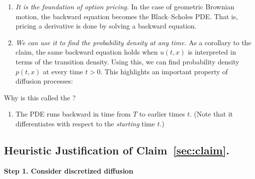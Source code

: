 \documentclass{article} %
\begin{document}
\begin{enumerate}
	\item \textit{It is the foundation of option pricing.} In the case of geometric Brownian motion, the backward equation becomes the Black–Scholes PDE.  That is, pricing a derivative is done by solving a backward equation.	
\item \textit{We can use it to find the probability density at any time.}  As a corollary to the claim, the same backward equation holds when $u(t,x)$ is interpreted in terms of the transition density.  Using this, we can find probability density $p(t,x)$ at every time $t>0$.	This highlights an important property of diffusion processes:

	





\end{enumerate}


Why is this called the ?

\begin{enumerate}
\item The PDE runs backward in time from $T$ to earlier times $t$.   (Note that it differentiates with respect to the \textit{starting} time $t$.)
\end{enumerate}


\subsection{Heuristic Justification of Claim~\ref{sec:claim}.}

\textbf{Step 1. Consider discretized diffusion}
 
\end{document}
